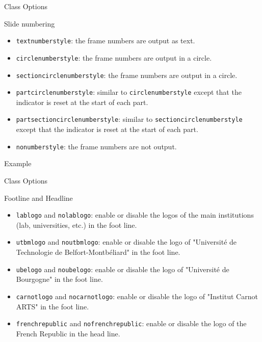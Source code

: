\documentclass[english,sectioncirclenumberstyle]{ciadbeamer}
\begin{document}
\begin{frame}[t]{Class Options \insertcontinuationtext}
	\begin{block}{Slide numbering}
		\begin{itemize}
		\item \texttt{textnumberstyle}: the frame numbers are output as text.
		\item \texttt{circlenumberstyle}: the frame numbers are output in a circle.
		\item \texttt{sectioncirclenumberstyle}: the frame numbers are output in a circle.
		\item \texttt{partcirclenumberstyle}: similar to \texttt{circlenumberstyle} except that the indicator is reset at the start of each part.
		\item \texttt{partsectioncirclenumberstyle}: similar to \texttt{sectioncirclenumberstyle} except that the indicator is reset at the start of each part.
		\item \texttt{nonumberstyle}: the frame numbers are not output.
		\end{itemize}
	\end{block}
	\begin{block}{Example}
		\hyperlink{progressbartypes}{}
	\end{block}
\end{frame}

\begin{frame}[t]{Class Options \insertcontinuationtext}
	\begin{block}{Footline and Headline}
		\begin{itemize}
		\item \texttt{lablogo} and \texttt{nolablogo}: enable or disable the logos of the main institutions (lab, universities, etc.) in the foot line.
		\item \texttt{utbmlogo} and \texttt{noutbmlogo}: enable or disable the logo of "Universit\'e de Technologie de Belfort-Montb\'eliard" in the foot line.
		\item \texttt{ubelogo} and \texttt{noubelogo}: enable or disable the logo of "Universit\'e de Bourgogne" in the foot line.
		\item \texttt{carnotlogo} and \texttt{nocarnotlogo}: enable or disable the logo of "Institut Carnot ARTS" in the foot line.
		\item \texttt{frenchrepublic} and \texttt{nofrenchrepublic}: enable or disable the logo of the French Republic in the head line.
		\end{itemize}
	\end{block}
\end{frame}
\end{document}
